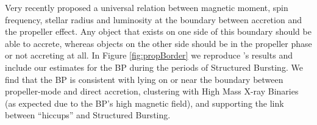 \par Very recently \citealp{Campana_PropBorder} proposed a universal relation between magnetic moment, spin frequency, stellar radius and luminosity at the boundary between accretion and the propeller effect.  Any object that exists on one side of this boundary should be able to accrete, whereas objects on the other side should be in the propeller phase or not accreting at all.  In  Figure \ref{fig:propBorder} we reproduce \citealp{Campana_PropBorder}'s results and include our estimates for the BP during the periods of Structured Bursting. We find that the BP is consistent with lying on or near the boundary between propeller-mode and direct accretion, clustering with High Mass X-ray Binaries (as expected due to the BP's high magnetic field), and supporting the link between ``hiccups'' and Structured Bursting.


